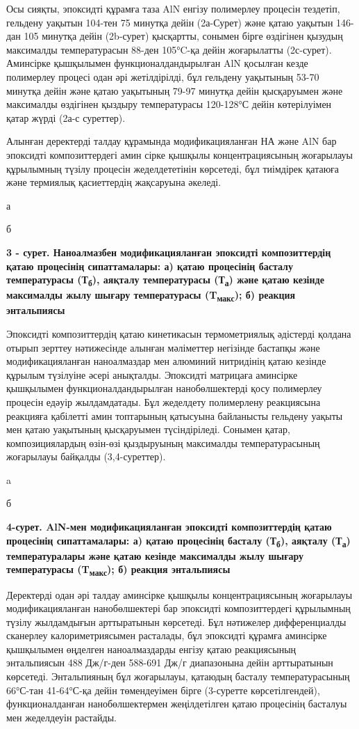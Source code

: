 Осы сияқты, эпоксидті құрамға таза AlN енгізу полимерлеу процесін
тездетіп, гельдену уақытын 104-тен 75 минутқа дейін (2а-Сурет) және
қатаю уақытын 146-дан 105 минутқа дейін (2b-сурет) қысқартты, сонымен
бірге өздігінен қызудың максималды температурасын 88-ден 105°C-қа дейін
жоғарылатты (2с-сурет). Аминсірке қышқылымен функционалдандырылған AlN
қосылған кезде полимерлеу процесі одан әрі жетілдірілді, бұл гельдену
уақытының 53-70 минутқа дейін және қатаю уақытының 79-97 минутқа дейін
қысқаруымен және максималды өздігінен қыздыру температурасы 120-128°С
дейін көтерілуімен қатар жүрді (2а-с суреттер).

Алынған деректерді талдау құрамында модификацияланған НА және AlN бар
эпоксидті композиттердегі амин сірке қышқылы концентрациясының
жоғарылауы құрылымның түзілу процесін жеделдететінін көрсетеді, бұл
тиімдірек қатаюға және термиялық қасиеттердің жақсаруына әкеледі.

а

б

{\bfseries 3 - сурет. Наноалмазбен модификацияланған эпоксидті
композиттердің қатаю процесінің сипаттамалары: а) қатаю процесінің
басталу температурасы (Т\textsubscript{б}), аяқталу температурасы
(Т\textsubscript{а}) және қатаю кезінде максималды жылу шығару
температурасы (T\textsubscript{макс}); б) реакция энтальпиясы}

Эпоксидті композиттердің қатаю кинетикасын термометриялық әдістерді
қолдана отырып зерттеу нәтижесінде алынған мәліметтер негізінде бастапқы
және модификацияланған наноалмаздар мен алюминий нитридінің қатаю
кезінде құрылым түзілуіне әсері анықталды. Эпоксидті матрицаға аминсірке
қышқылымен функционалдандырылған нанобөлшектерді қосу полимерлеу
процесін едәуір жылдамдатады. Бұл жеделдету полимерлену реакциясына
реакцияға қабілетті амин топтарының қатысуына байланысты гельдену уақыты
мен қатаю уақытының қысқаруымен түсіндіріледі. Сонымен қатар,
композициялардың өзін-өзі қыздыруының максималды температурасының
жоғарылауы байқалды (3,4-суреттер).

a

б

{\bfseries 4-сурет. AlN-мен модификацияланған эпоксидті композиттердің
қатаю процесінің сипаттамалары: а) қатаю процесінің басталу
(Т\textsubscript{б}), аяқталу (Т\textsubscript{а}) температуралары және
қатаю кезінде максималды жылу шығару температурасы
(T\textsubscript{макс}); б) реакция энтальпиясы}

Деректерді одан әрі талдау аминсірке қышқылы концентрациясының
жоғарылауы модификацияланған нанобөлшектері бар эпоксидті
композиттердегі құрылымның түзілу жылдамдығын арттыратынын көрсетеді.
Бұл нәтижелер дифференциалды сканерлеу калориметриясымен расталады, бұл
эпоксидті құрамға аминсірке қышқылымен өңделген наноалмаздарды енгізу
қатаю реакциясының энтальпиясын 488 Дж/г-ден 588-691 Дж/г диапазонына
дейін арттыратынын көрсетеді. Энтальпияның бұл жоғарылауы, қатаюдың
басталу температурасының 66°С-тан 41-64°С-қа дейін төмендеуімен бірге
(3-суретте көрсетілгендей), функционалданған нанобөлшектермен
жеңілдетілген қатаю процесінің басталуы мен жеделдеуін растайды.

